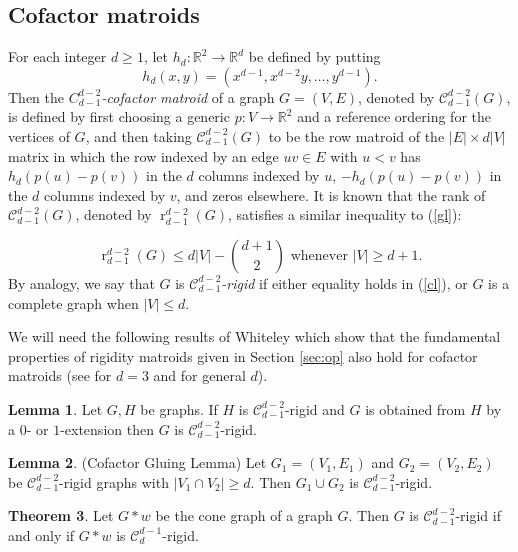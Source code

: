 \documentclass[11pt,a4paper]{article}
\theoremstyle{definition}
\newtheorem{theorem}{Theorem}[section]
\newtheorem{lemma}[theorem]{Lemma}
\DeclareMathOperator{\rr}{r}
\newcommand{\R}{\mathbb{R}}
\newcommand{\cC}{\mathcal{C}}
\begin{document}
\subsection{Cofactor matroids}\label{sec:cofdefn}

For each integer $d\geq 1$, let $h_d:\R^2\to \R^d$ be defined by putting
$$h_d(x,y)=(x^{d-1},x^{d-2}y,\ldots,y^{d-1}).$$ Then the {\it $C^{d-2}_{d-1}$-cofactor matroid} of a graph $G=(V,E)$, denoted by $\cC^{d-2}_{d-1}(G)$,
is defined by first choosing a generic $p:V\to \R^2$ and a reference ordering for the vertices of $G$, and then taking $\cC^{d-2}_{d-1}(G)$ to be the row matroid of the $|E|\times d|V|$ matrix in which the row indexed by an edge $uv\in E$ with $u<v$ has $h_d(p(u)-p(v))$ in the $d$ columns indexed by $u$, $-h_d(p(u)-p(v))$ in the $d$ columns indexed by $v$, and zeros elsewhere. It is known that the rank of $\cC^{d-2}_{d-1}(G)$, denoted by $\rr^{d-2}_{d-1}(G)$, satisfies a similar  inequality to (\ref{gl}): 

\begin{equation}
\label{cl}
\rr^{d-2}_{d-1}(G)\leq d|V|-\binom{d+1}{2} \mbox{ whenever $|V|\geq d+1$.}
\end{equation}
By analogy, we say that $G$ is {\em $\cC^{d-2}_{d-1}$-rigid} if either equality holds in (\ref{cl}), or  $G$ is a complete graph when $|V|\leq d$.

We will need the following results of Whiteley which show that the fundamental properties of rigidity matroids given in Section \ref{sec:op} also hold for cofactor matroids (see \cite[Sections 10.1 and 10.2]{Wlong} for $d=3$ and \cite[Section 11.3]{Wlong} for general $d$).

\begin{lemma}
\label{lem:c1ext}
Let $G,H$ be  graphs. If $H$ is $\cC^{d-2}_{d-1}$-rigid  and $G$ is obtained from $H$ by a $0$- or
$1$-extension then $G$ is $\cC^{d-2}_{d-1}$-rigid.
\end{lemma}

\begin{lemma} (Cofactor Gluing Lemma)
\label{cgluing}
Let $G_1=(V_1,E_1)$ and $G_2=(V_2,E_2)$ be $\cC^{d-2}_{d-1}$-rigid graphs with
$|V_1\cap V_2|\geq d$. Then $G_1\cup G_2$ is $\cC^{d-2}_{d-1}$-rigid.
\end{lemma}


\begin{theorem} 
\label{thm:coning_cof} 
Let $G*w$ be the cone graph of a graph $G$. Then  
$G$ is  $\cC^{d-2}_{d-1}$-rigid if and only if $G*w$ is $\cC^{d-1}_{d}$-rigid.
\end{theorem}
\end{document}
